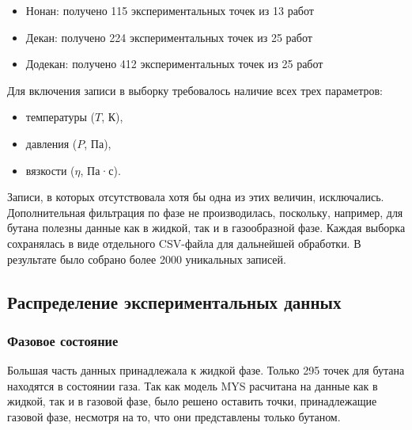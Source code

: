 \documentclass[a4paper,12pt]{article}
\begin{document}
\begin{itemize}
      \item Нонан: получено 115 экспериментальных точек из 13 работ \cite{acs.jced.7b00121,acs.jced.7b00650,j.fluid.2010.10.009,j.jct.2004.09.021,j.jct.2005.03.024,j.jct.2005.10.011,j.jct.2013.09.017,je200757a,je300899n,je400250u,je400835u,je700202h,je700428f}
      \item Декан: получено 224 экспериментальных точек из 25 работ \cite{acs.jced.5b00270,acs.jced.6b00542,acs.jced.7b00121,acs.jced.7b00650,j.fluid.2010.10.009,j.jct.2003.12.005,j.jct.2004.09.021,j.jct.2005.03.024,j.jct.2005.10.011,j.jct.2007.05.016,j.jct.2008.02.005,j.jct.2013.05.014,j.jct.2013.09.017,je034208m,je0501585,je060389r,je300899n,je400250u,je400835u,je4008926,je800348s,je800417q,je800635g,s10765-005-5572-8,s10765-008-0542-6}
      \item Додекан: получено 412 экспериментальных точек из 25 работ \cite{acs.jced.6b00391,acs.jced.6b00542,acs.jced.6b00688,acs.jced.7b00201,acs.jced.7b00466,acs.jced.7b00650,acs.jced.7b00866,acs.jced.8b00008,acs.jced.8b00438,acs.jced.8b01135,acs.jced.8b01233,acs.jced.9b00187,j.fluid.2015.07.022,j.jct.2003.12.005,j.jct.2004.09.021,j.jct.2005.03.024,j.jct.2013.12.022,j.jct.2014.02.012,j.jct.2015.12.021,je034208m,je060491o,je200757a,je400493x,je400835u,je5000132}
    \end{itemize}
    
    Для включения записи в выборку требовалось наличие всех трех параметров:
    \begin{itemize}
      \item температуры (\( T \), К),
      \item давления (\( P \), Па),
      \item вязкости (\( \eta \), Па·с).
    \end{itemize}
    
    Записи, в которых отсутствовала хотя бы одна из этих величин, исключались. Дополнительная фильтрация по фазе не производилась, поскольку, например, для бутана полезны данные как в жидкой, так и в газообразной фазе. Каждая выборка сохранялась в виде отдельного CSV-файла для дальнейшей обработки. В результате было собрано более 2000 уникальных записей.

  \subsection{Распределение экспериментальных данных}
    \subsubsection{Фазовое состояние}
      Большая часть данных принадлежала к жидкой фазе. Только 295 точек для бутана находятся в состоянии газа. Так как модель MYS расчитана на данные как в жидкой, так и в газовой фазе, было решено оставить точки, принадлежащие газовой фазе, несмотря на то, что они представлены только бутаном.
\end{document}
